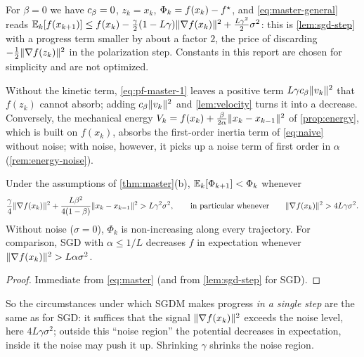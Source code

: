 \begin{remark}[The case $\beta=0$]
For $\beta=0$ we have $c_\beta=0$, $z_k=x_k$, $\Phi_k=f(x_k)-f^\star$, and
\eqref{eq:master-general} reads
$\mathbb{E}_k[f(x_{k+1})]\le f(x_k)-\frac\gamma2(1-L\gamma)\lVert \nabla f(x_k)\rVert^2+\frac{L\gamma^2}{2}\sigma^2$:
this is \cref{lem:sgd-step} with a progress term smaller by about a factor $2$, the price of
discarding $-\frac12\lVert \nabla f(z_k)\rVert^2$ in the polarization step. Constants in this
report are chosen for simplicity and are not optimized.
\end{remark}

\begin{remark}
Without the kinetic term, \eqref{eq:pf-master-1} leaves a positive term
$L\gamma c_\beta\lVert v_k\rVert^2$ that $f(z_k)$ cannot absorb; adding $c_\beta\lVert v_k\rVert^2$ and
\cref{lem:velocity} turns it into a decrease. Conversely, the mechanical energy
$V_k=f(x_k)+\frac{\beta}{2\alpha}\lVert x_k-x_{k-1}\rVert^2$ of \cref{prop:energy}, which is built on
$f(x_k)$, absorbs the first-order inertia term of \eqref{eq:naive} without noise; with noise,
however, it picks up a noise term of first order in $\alpha$ (\cref{rem:energy-noise}).
\end{remark}

\begin{corollary}\label{cor:when-decrease}
Under the assumptions of \cref{thm:master}(b), $\mathbb{E}_k[\Phi_{k+1}]<\Phi_k$ whenever
\[
  \frac\gamma4\lVert \nabla f(x_k)\rVert^2+\frac{L\beta^2}{4(1-\beta)}\lVert x_k-x_{k-1}\rVert^2>L\gamma^2\sigma^2,
  \qquad\text{in particular whenever}\qquad \lVert \nabla f(x_k)\rVert^2>4L\gamma\sigma^2 .
\]
Without noise ($\sigma=0$), $\Phi_k$ is non-increasing along every trajectory.
For comparison, SGD with $\alpha\le1/L$ decreases $f$ in expectation whenever
$\lVert \nabla f(x_k)\rVert^2>L\alpha\sigma^2$.
\end{corollary}

\begin{proof}
Immediate from \eqref{eq:master} (and from \cref{lem:sgd-step} for SGD).
\end{proof}

So the circumstances under which SGDM makes progress \emph{in a single step} are the same
as for SGD: it suffices that the signal $\lVert \nabla f(x_k)\rVert^2$ exceeds the noise level,
here $4L\gamma\sigma^2$; outside this ``noise region'' the potential decreases in
expectation, inside it the noise may push it up. Shrinking $\gamma$ shrinks the noise region.

